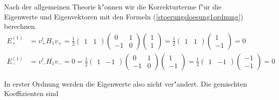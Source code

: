 \begin{loesung}
Nach der allgemeinen Theorie k"onnen wir die Korrekturterme f"ur die
Eigenwerte und Eigenvektoren mit den Formeln (\ref{stoerungsloesung1ordnung})
berechnen.
\begin{align*}
E_+^{(1)}&=v_+^tH_1v_+
	=\frac12\begin{pmatrix}1&1\end{pmatrix}
		\begin{pmatrix}0&1\\-1&0\end{pmatrix}
		\begin{pmatrix}1\\1\end{pmatrix}
	=\frac12\begin{pmatrix}1&1\end{pmatrix}
		\begin{pmatrix}1\\-1\end{pmatrix}
	=0
\\
E_-^{(1)}&=v_-^tH_1v_-=0
	=\frac12\begin{pmatrix}1&-1\end{pmatrix}
		\begin{pmatrix}0&1\\-1&0\end{pmatrix}
		\begin{pmatrix}1\\-1\end{pmatrix}
	=\frac12\begin{pmatrix}1&-1\end{pmatrix}
		\begin{pmatrix}-1\\-1\end{pmatrix}
	=0
\end{align*}
\end{loesung}
In erster Ordnung werden die Eigenwerte also nicht ver"andert.
Die gemischten Koeffizienten sind
